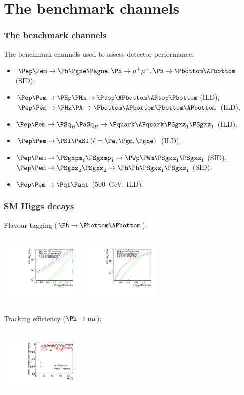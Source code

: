 \documentclass{beamer}
\begin{document}
\section[Benchmarks]{The benchmark channels}
\begin{frame}
\frametitle{The benchmark channels}
The benchmark channels used to assess detector performance:
\begin{itemize}
\item $\Pep\Pem \to \Ph \Pgne \Pagne, \Ph \to \mu^+\mu^-, \Ph \to
\Pbottom\APbottom$ (\alert{SID}),
\item  $\Pep\Pem \to \PHp \PHm\to \Ptop\APbottom\APtop\Pbottom$(ILD),\\
$\Pep\Pem \to \PHz \PA\to\Pbottom\APbottom\Pbottom\APbottom$ (ILD),
\item $\Pep\Pem \to \PSq_R \PaSq_R\to\Pquark\APquark\PSgxz_1\PSgxz_1$ (ILD), 
\item $\Pep\Pem \to \PSl \PaSl \,(\ell = \Pe,\Pgm,\Pgne)$ (ILD), 
\item $\Pep\Pem \to \PSgxpm_1 \PSgxmp_1\to\PWp\PWm\PSgxz_1\PSgxz_1$ (\alert{SID}),\\
$\Pep\Pem \to \PSgxz_2 \PSgxz_2\to \Ph\Ph\PSgxz_1\PSgxz_1$ (\alert{SID}),
\item  $\Pep\Pem \to \Pqt \Paqt$ (500~GeV, ILD).
\end{itemize}
\end{frame}
\begin{frame}
\frametitle{SM Higgs decays}
Flavour tagging ($\Ph\to\Pbottom\APbottom$):
\begin{columns}[c]
\column{4cm}
\centering
\includegraphics[width=4cm]{Light_Higgs_Flavour_Tag.pdf}
\column{4cm}
\centering
\includegraphics[width=4cm]{Light_Higgs_Flavour_Tag_C.pdf}
\end{columns}
Tracking efficiency ($\Ph\to\mu\mu$):
\begin{columns}[c]
\column{4cm}
\centering
\includegraphics[width=4cm]{MuonEfficiency2.pdf}
\column{4cm}
\centering
\end{columns}
\end{frame}
\end{document}
